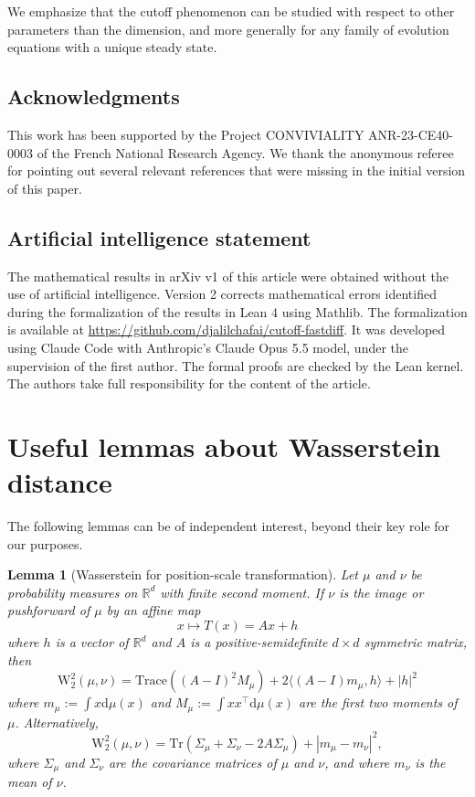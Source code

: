 \documentclass[10pt,reqno]{amsart}
\numberwithin{equation}{section}
\newtheorem{lemma}[theorem]{Lemma}%
\begin{document}
We emphasize that the cutoff phenomenon can be studied with respect to other parameters than the dimension, and more generally for any family of evolution equations with a unique steady state. 

\subsection*{Acknowledgments}
This work has been supported by the Project CONVIVIALITY ANR-23-CE40-0003 of the French National Research Agency. 
We thank the anonymous referee for pointing out several relevant references that were missing in the initial version of this paper.

\subsection*{Artificial intelligence statement}
The mathematical results in arXiv v1 of this article were obtained without the
use of artificial intelligence. Version 2 corrects mathematical errors
identified during the formalization of the results in Lean 4 using Mathlib.
The formalization is available at
\url{https://github.com/djalilchafai/cutoff-fastdiff}. It was developed using
Claude Code with Anthropic's Claude Opus 5.5 model, under the supervision of
the first author. The formal proofs are checked by the Lean kernel. The
authors take full responsibility for the content of the article.

\section{Useful lemmas about Wasserstein distance}

The following lemmas can be of independent interest, beyond their key role for our purposes.

\begin{lemma}[Wasserstein for position-scale transformation]\label{le:wasposca}
  Let $\mu$ and $\nu$ be probability measures on $\mathbb{R}^d$ with finite
  second moment. If $\nu$ is the image or pushforward of $\mu$ by
  an affine map 
  \begin{equation}
    x\mapsto T(x)=Ax+h
  \end{equation}
  where $h$ is a
  vector of $\mathbb{R}^d$ and $A$ is a positive-semidefinite $d\times d$
  symmetric matrix, then
 \begin{equation}\label{eq:W2mom}
    \mathrm{W}_2^2(\mu,\nu)
    =\mathrm{Trace}((A-I)^2M_\mu)
    +2\langle(A-I)m_\mu,h\rangle+|h|^2
 \end{equation}
 where $m_\mu:=\int x\mathrm{d}\mu(x)$ and $M_\mu:=\int
 xx^\top\mathrm{d}\mu(x)$ are the first two moments of $\mu$. Alternatively, 
  \begin{equation}\label{eq:W2cov}
   \mathrm{W}_2^2(\mu,\nu)=\mathrm{Tr}(\Sigma_\mu+\Sigma_\nu-2A\Sigma_\mu)+|m_\mu-m_\nu|^2,
  \end{equation}
 where $\Sigma_\mu$ and $\Sigma_\nu$ are the covariance matrices of $\mu$ and $\nu$, and
  where $m_\nu$ is the mean of $\nu$. 
\end{lemma}
\end{document}

